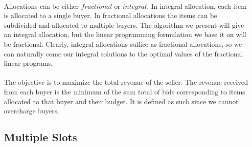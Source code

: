 \documentclass[letterpaper,12pt,oneside,onecolumn]{article}
\begin{document}
\paragraph{}
Allocations can be either $\textit{fractional}$ or $\textit{integral}$. In integral allocation, each item is allocated to a single buyer. In fractional allocations the items can be subdivided and allocated to multiple buyers. The algorithm we present will give an integral allocation, but the linear programming formulation we base it on will be fractional. Clearly, integral allocations suffice as fractional allocations, so we can naturally come our integral solutions to the optimal values of the fractional linear programs.
\paragraph{}
The objective is to maximize the total revenue of the seller. The revenue received from each buyer is the minimum of the sum total of bids corresponding to items allocated to that buyer and their budget. It is defined as such since we cannot overcharge buyers.
\subsection{Multiple Slots}


\end{document}
